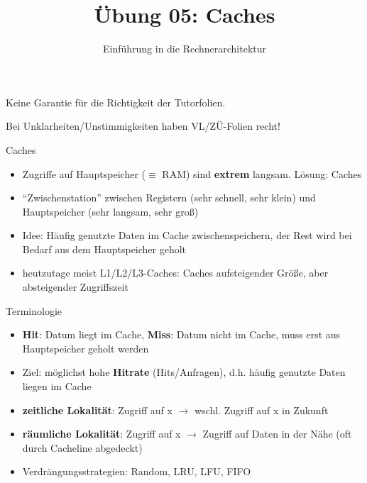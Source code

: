 

\title{Übung 05: Caches}
\subtitle{Einführung in die Rechnerarchitektur}
\date{}



\maketitle

\begin{frame}[c, fragile]{}{}
	\begin{center}
		\LARGE  Keine Garantie für die Richtigkeit der Tutorfolien.

		\Large Bei Unklarheiten/Unstimmigkeiten haben VL/ZÜ-Folien recht!
	\end{center}
\end{frame}

\begin{frame}[fragile, c]{Caches}{}
	\begin{itemize}
		\item Zugriffe auf Hauptspeicher ($\equiv$ RAM) sind \textbf{extrem} langsam. Lösung: Caches
		\item \enquote{Zwischenstation} zwischen Registern (sehr schnell, sehr klein) und Hauptspeicher (sehr langsam, sehr groß)
		\item Idee: Häufig genutzte Daten im Cache zwischenspeichern, der Rest wird bei Bedarf aus dem Hauptspeicher geholt
		\item heutzutage meist L1/L2/L3-Caches: Caches aufsteigender Größe, aber absteigender Zugriffszeit
	\end{itemize}
\end{frame}


\begin{frame}[c, fragile]{Terminologie}
	\begin{itemize}
		\item \textbf{Hit}: Datum liegt im Cache, \textbf{Miss}: Datum nicht im Cache, muss erst aus Hauptspeicher geholt werden
		\item Ziel: möglichst hohe \textbf{Hitrate} (Hits/Anfragen), d.h. häufig genutzte Daten liegen im Cache
		\item \textbf{zeitliche Lokalität}: Zugriff auf x $\rightarrow$ wschl. Zugriff auf x in Zukunft
		\item \textbf{räumliche Lokalität}: Zugriff auf x $\rightarrow$ Zugriff auf Daten in der Nähe (oft durch Cacheline abgedeckt)
		\item Verdrängungsstrategien: Random, LRU, LFU, FIFO
	\end{itemize}
\end{frame}

